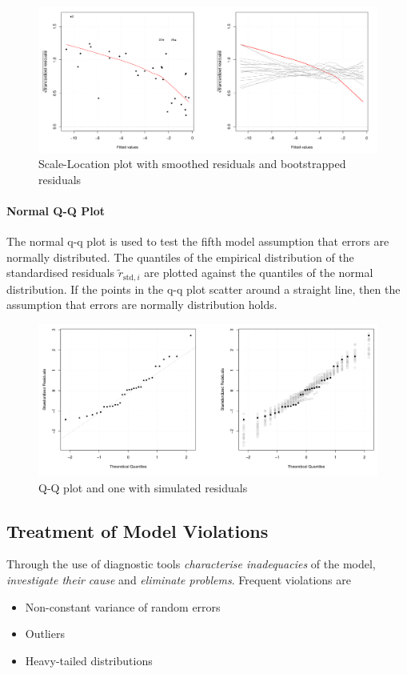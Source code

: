 \documentclass[11pt]{article}
\theoremstyle{definition}
\begin{document}
\begin{figure}[H]
	\centering
	\includegraphics[width=0.8\linewidth]{img/scale_location_plot}
	\caption{Scale-Location plot with smoothed residuals and bootstrapped residuals}
	\label{fig:scalelocationplot}
\end{figure}


\paragraph{Normal Q-Q Plot}
The normal q-q plot is used to test the fifth model assumption that errors are normally distributed. The quantiles of the empirical distribution of the standardised residuals $\tilde{r}_{\text{std},i}$ are plotted against the quantiles of the normal distribution. If the points in the q-q plot scatter around a straight line, then the assumption that errors are normally distribution holds.

\begin{figure}[H]
	\centering
	\includegraphics[width=0.8\linewidth]{img/q-q_plot}
	\caption{Q-Q plot and one with simulated residuals}
	\label{fig:q-qplot}
\end{figure}

\subsection{Treatment of Model Violations}
Through the use of diagnostic tools \textit{characterise inadequacies} of the model, \textit{investigate their cause} and \textit{eliminate problems}. Frequent violations are
\begin{itemize}
	\item Non-constant variance of random errors
	\item Outliers
	\item Heavy-tailed distributions
\end{itemize}
\end{document}
